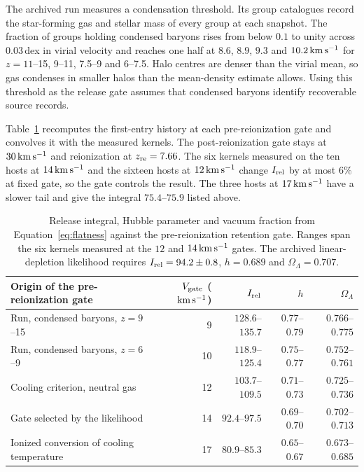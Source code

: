 The archived run measures a condensation threshold. Its group catalogues record
the star-forming gas and stellar mass of every group at each snapshot.
The fraction of groups holding condensed baryons rises from below $0.1$
to unity across $0.03\,$dex in virial velocity and reaches one half at
$8.6$, $8.9$, $9.3$ and $10.2\,\mathrm{km\,s^{-1}}$ for $z=11$--15, 9--11, 7.5--9 and
6--7.5. Halo centres are denser than the virial mean, so gas condenses
in smaller halos than the mean-density estimate allows. Using this
threshold as the release gate assumes that condensed baryons identify
recoverable source records.

Table~\ref{tab:coolinggate} recomputes the first-entry history at each
pre-reionization gate and convolves it with the measured kernels. The
post-reionization gate stays at $30\,\mathrm{km\,s^{-1}}$ and reionization at
$z_{\rm re}=7.66$. The six kernels measured on the ten hosts at $14\,\mathrm{km\,s^{-1}}$
and the sixteen hosts at $12\,\mathrm{km\,s^{-1}}$ change $I_{\rm rel}$ by at most $6\%$
at fixed gate, so the gate controls the result. The three hosts at
$17\,\mathrm{km\,s^{-1}}$ have a slower tail and give the integral $75.4$--$75.9$ listed
above.

\begin{table}[htbp]
\centering\small
\begin{tabular}{lrrrr}
\toprule
Origin of the pre-reionization gate & $V_{\rm gate}$ ($\mathrm{km\,s^{-1}}$) & $I_{\rm rel}$ & $h$ & $\Omega_\Lambda$ \\
\midrule
Run, condensed baryons, $z=9$--15 & 9 & $128.6$--$135.7$ & $0.77$--$0.79$ & $0.766$--$0.775$ \\
Run, condensed baryons, $z=6$--9 & 10 & $118.9$--$125.4$ & $0.75$--$0.77$ & $0.752$--$0.761$ \\
Cooling criterion, neutral gas & 12 & $103.7$--$109.5$ & $0.71$--$0.73$ & $0.725$--$0.736$ \\
Gate selected by the likelihood & 14 & $92.4$--$97.5$ & $0.69$--$0.70$ & $0.702$--$0.713$ \\
Ionized conversion of cooling temperature & 17 & $80.9$--$85.3$ & $0.65$--$0.67$ & $0.673$--$0.685$ \\
\bottomrule
\end{tabular}
\caption{Release integral, Hubble parameter and vacuum fraction from
Equation~\eqref{eq:flatness} against the pre-reionization retention gate.
Ranges span the six kernels measured at the $12$ and $14\,\mathrm{km\,s^{-1}}$ gates.
The archived linear-depletion likelihood requires $I_{\rm rel}=94.2\pm0.8$, $h=0.689$ and
$\Omega_\Lambda=0.707$.}
\label{tab:coolinggate}
\end{table}


